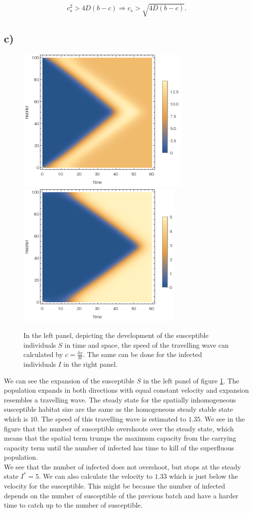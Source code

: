 $$
 c^2_s>4D(b-c)\Rightarrow c_s > \sqrt{4D(b-c)}.
 $$
 
\subsection*{c)}

\begin{figure}
\centering
\includegraphics[scale=0.5]{img/listdensityplot_S.png}
\includegraphics[scale=0.5]{img/listdensityplot_P.png}
\caption{\label{fig:pic1c} In the left panel, depicting the development of the susceptible individuals $S$ in time and space, the speed of the travelling wave can calculated by $c=\frac{\delta x}{\delta t}$. The same can be done for the infected individuals $I$ in the right panel.}
\end{figure}

We can see the expansion of the susceptible $S$ in the left panel of figure \ref{fig:pic1c}. The population expands in both directions with equal constant velocity and expansion resembles a travelling wave. The steady state for the spatially inhomogeneous susceptible habitat size are the same as the homogeneous steady stable state which is $10$. The speed of this travelling wave is estimated to $1.35$. We see in the figure that the number of susceptible overshoots over the steady state, which means that the spatial term trumps the maximum capacity from the carrying capacity term until the number of infected has time to kill of the superfluous population. \\

We see that the number of infected does not overshoot, but stops at the steady state $I^*=5$. We can also calculate the velocity to $1.33$ which is just below the velocity for the susceptible. This might be because the number of infected depends on the number of susceptible of the previous batch and have a harder time to catch up to the number of susceptible.
